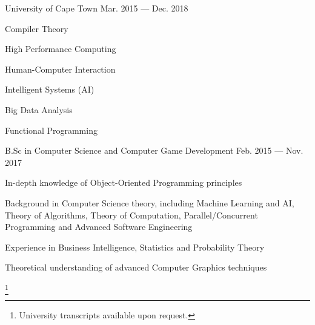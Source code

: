 
\begin{cventries}

  {University of Cape Town}
  {Mar. 2015 --- Dec. 2018}
  {}
  {
    \begin{cvitems}
      \item {Compiler Theory}
      \item {High Performance Computing}
      \item {Human-Computer Interaction}
      \item {Intelligent Systems (AI)}
      \item {Big Data Analysis}
      \item {Functional Programming}
    \end{cvitems}
  }

  {B.Sc in Computer Science and Computer Game Development}
  {Feb. 2015 --- Nov. 2017}
  {}
  {
    \begin{cvitems}
      \item {In-depth knowledge of Object-Oriented Programming principles}
      \item {Background in Computer Science theory, including Machine Learning and AI, Theory of Algorithms, Theory of Computation, Parallel/Concurrent Programming and Advanced Software Engineering}
      \item {Experience in Business Intelligence, Statistics and Probability Theory}
      \item {Theoretical understanding of advanced Computer Graphics techniques}
    \end{cvitems}
  }\footnote{University transcripts available upon request.}

\end{cventries}
